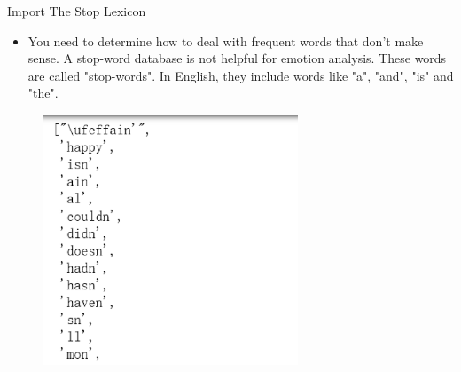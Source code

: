 \documentclass[
 size=14pt,
 paper=smartboard,  %
 mode=present, 		%
 display=slides, 	%
 style=tuliplab,  	%
 pauseslide,
 fleqn,leqno]{powerdot}
\begin{document}



\begin{slide}{Import The Stop Lexicon}
  
  \begin{itemize}
  \item 
  You need to determine how to deal with frequent words that don't make sense.
  A stop-word database is not helpful for emotion analysis. 
  These words are called "stop-words".
  In English, they include words like "a", "and", "is" and "the".  
\end{itemize}
\begin{figure}[htbp]
  \centering
  \begin{minipage}[t]{0.58\textwidth}
    \centering
    \centerline{\includegraphics[width=0.68\textwidth]{logos/stop.eps}}
    \vspace{-1.0em}
  \end{minipage}
\end{figure}
\end{slide}
\end{document}
